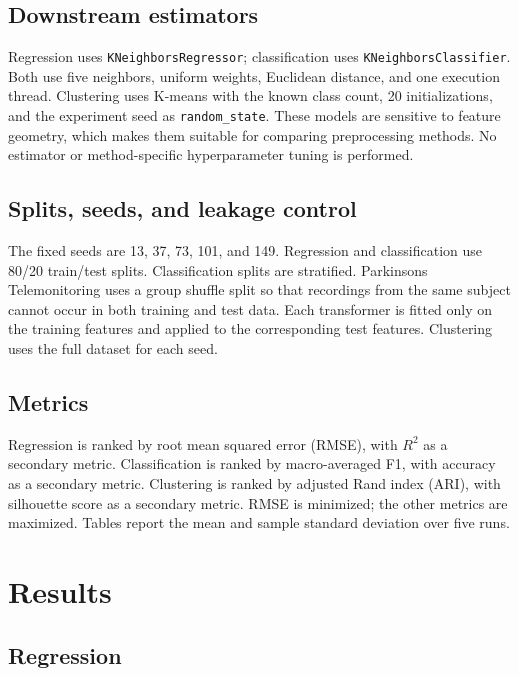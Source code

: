 \documentclass[11pt,a4paper]{article}
\begin{document}


\subsection{Downstream estimators}

Regression uses \texttt{KNeighborsRegressor}; classification uses
\texttt{KNeighborsClassifier}. Both use five neighbors, uniform weights,
Euclidean distance, and one execution thread. Clustering uses K-means with the
known class count, 20 initializations, and the experiment seed as
\texttt{random\_state}. These models are sensitive to feature geometry, which
makes them suitable for comparing preprocessing methods. No estimator or
method-specific hyperparameter tuning is performed.

\subsection{Splits, seeds, and leakage control}

The fixed seeds are 13, 37, 73, 101, and 149. Regression and classification use
80/20 train/test splits. Classification splits are stratified. Parkinsons
Telemonitoring uses a group shuffle split so that recordings from the same
subject cannot occur in both training and test data. Each transformer is fitted
only on the training features and applied to the corresponding test features.
Clustering uses the full dataset for each seed.

\subsection{Metrics}

Regression is ranked by root mean squared error (RMSE), with $R^2$ as a
secondary metric. Classification is ranked by macro-averaged F1, with accuracy
as a secondary metric. Clustering is ranked by adjusted Rand index (ARI), with
silhouette score as a secondary metric. RMSE is minimized; the other metrics
are maximized. Tables report the mean and sample standard deviation over five
runs.

\section{Results}

\subsection{Regression}
\end{document}
